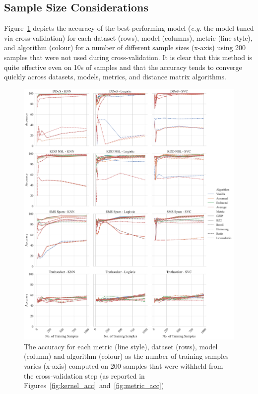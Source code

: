 \documentclass[preprint,12pt]{elsarticle}
\begin{document}
\subsection{Sample Size Considerations}
Figure~\ref{fig:sample_size} depicts the accuracy of the best-performing model (\textit{e.g.} the model tuned via cross-validation) for each dataset (rows), model (columns), metric (line style), and algorithm (colour) for a number of different sample sizes (x-axis) using 200 samples that were not used during cross-validation.
It is clear that this method is quite effective even on 10s of samples and that the accuracy tends to converge quickly across datasets, models, metrics, and distance matrix algorithms.
\begin{figure}
    \centering
    \includegraphics[width=\textwidth]{images/accuracy_vs_train_size.pdf}
    \caption{The accuracy for each metric (line style), dataset (rows), model (column) and algorithm (colour) as the number of training samples varies (x-axis) computed on 200 samples that were withheld from the cross-validation step (as reported in Figures~\ref{fig:kernel_acc}~and~\ref{fig:metric_acc})}
    \label{fig:sample_size}
\end{figure}
\end{document}
